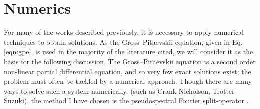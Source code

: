 \section{Numerics}\label{sec:numerics}
For many of the works described previously, it is necessary to apply numerical techniques to obtain solutions. As the Gross--Pitaevskii
equation, given in Eq. \eqref{eqn:gpe}, is used in the majority of the literature cited, we will consider it as the basis for the following discussion. The Gross--Pitaevskii equation is a second order non-linear partial differential equation, and so very few exact solutions exist; the problem must often be tackled by a numerical approach. Though there are many ways to solve such a system numerically, (such as Crank-Nicholson, Trotter-Suzuki), the method I have chosen is the pseudospectral Fourier split-operator \cite{Num:Bauke_cpc_2011}.

